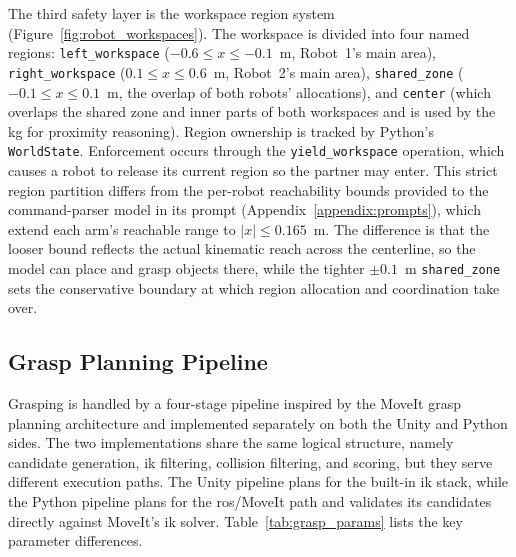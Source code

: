The third safety layer is the workspace region system (Figure~\ref{fig:robot_workspaces}). The workspace is divided into four named regions: \texttt{left\_workspace} ($-0.6 \leq x \leq -0.1$~m, Robot~1’s main area), \texttt{right\_workspace} ($0.1 \leq x \leq 0.6$~m, Robot~2’s main area), \texttt{shared\_zone} ($-0.1 \leq x \leq 0.1$~m, the overlap of both robots’ allocations), and \texttt{center} (which overlaps the shared zone and inner parts of both workspaces and is used by the \gls{kg} for proximity reasoning). Region ownership is tracked by Python’s \texttt{WorldState}. Enforcement occurs through the \texttt{yield\_workspace} operation, which causes a robot to release its current region so the partner may enter. This strict region partition differs from the per-robot reachability bounds provided to the command-parser model in its prompt (Appendix~\ref{appendix:prompts}), which extend each arm's reachable range to $|x| \leq 0.165$~m. The difference is that the looser bound reflects the actual kinematic reach across the centerline, so the model can place and grasp objects there, while the tighter $\pm0.1$~m \texttt{shared\_zone} sets the conservative boundary at which region allocation and coordination take over.

\subsection{Grasp Planning Pipeline}\label{sec:grasp-pipeline}
Grasping is handled by a four-stage pipeline inspired by the MoveIt grasp planning architecture and implemented separately on both the Unity and Python sides. The two implementations share the same logical structure, namely candidate generation, \gls{ik} filtering, collision filtering, and scoring, but they serve different execution paths. The Unity pipeline plans for the built-in \gls{ik} stack, while the Python pipeline plans for the \gls{ros}/MoveIt path and validates its candidates directly against MoveIt’s \gls{ik} solver. Table~\ref{tab:grasp_params} lists the key parameter differences.

